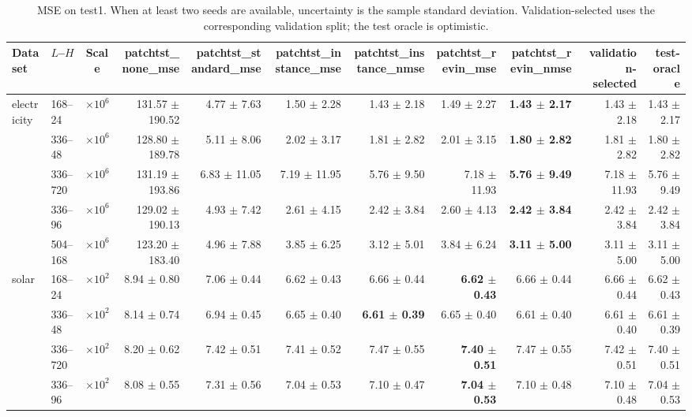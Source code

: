 \begin{table}[htbp]
\centering
\caption{MSE on test1. When at least two seeds are available, uncertainty is the sample standard deviation. Validation-selected uses the corresponding validation split; the test oracle is optimistic.}
\begin{tabular}{llcrrrrrrr|r}
\toprule
Dataset & $L$--$H$ & Scale & patchtst\_none\_mse & patchtst\_standard\_mse & patchtst\_instance\_mse & patchtst\_instance\_nmse & patchtst\_revin\_mse & patchtst\_revin\_nmse & validation-selected & test-oracle \\
\midrule
electricity & 168--24 & $\times 10^{6}$ & 131.57 $\pm$ 190.52 & 4.77 $\pm$ 7.63 & 1.50 $\pm$ 2.28 & 1.43 $\pm$ 2.18 & 1.49 $\pm$ 2.27 & \textbf{1.43 $\pm$ 2.17} & 1.43 $\pm$ 2.18 & 1.43 $\pm$ 2.17 \\
 & 336--48 & $\times 10^{6}$ & 128.80 $\pm$ 189.78 & 5.11 $\pm$ 8.06 & 2.02 $\pm$ 3.17 & 1.81 $\pm$ 2.82 & 2.01 $\pm$ 3.15 & \textbf{1.80 $\pm$ 2.82} & 1.81 $\pm$ 2.82 & 1.80 $\pm$ 2.82 \\
 & 336--720 & $\times 10^{6}$ & 131.19 $\pm$ 193.86 & 6.83 $\pm$ 11.05 & 7.19 $\pm$ 11.95 & 5.76 $\pm$ 9.50 & 7.18 $\pm$ 11.93 & \textbf{5.76 $\pm$ 9.49} & 7.18 $\pm$ 11.93 & 5.76 $\pm$ 9.49 \\
 & 336--96 & $\times 10^{6}$ & 129.02 $\pm$ 190.13 & 4.93 $\pm$ 7.42 & 2.61 $\pm$ 4.15 & 2.42 $\pm$ 3.84 & 2.60 $\pm$ 4.13 & \textbf{2.42 $\pm$ 3.84} & 2.42 $\pm$ 3.84 & 2.42 $\pm$ 3.84 \\
 & 504--168 & $\times 10^{6}$ & 123.20 $\pm$ 183.40 & 4.96 $\pm$ 7.88 & 3.85 $\pm$ 6.25 & 3.12 $\pm$ 5.01 & 3.84 $\pm$ 6.24 & \textbf{3.11 $\pm$ 5.00} & 3.11 $\pm$ 5.00 & 3.11 $\pm$ 5.00 \\
\midrule
solar & 168--24 & $\times 10^{2}$ & 8.94 $\pm$ 0.80 & 7.06 $\pm$ 0.44 & 6.62 $\pm$ 0.43 & 6.66 $\pm$ 0.44 & \textbf{6.62 $\pm$ 0.43} & 6.66 $\pm$ 0.44 & 6.66 $\pm$ 0.44 & 6.62 $\pm$ 0.43 \\
 & 336--48 & $\times 10^{2}$ & 8.14 $\pm$ 0.74 & 6.94 $\pm$ 0.45 & 6.65 $\pm$ 0.40 & \textbf{6.61 $\pm$ 0.39} & 6.65 $\pm$ 0.40 & 6.61 $\pm$ 0.40 & 6.61 $\pm$ 0.40 & 6.61 $\pm$ 0.39 \\
 & 336--720 & $\times 10^{2}$ & 8.20 $\pm$ 0.62 & 7.42 $\pm$ 0.51 & 7.41 $\pm$ 0.52 & 7.47 $\pm$ 0.55 & \textbf{7.40 $\pm$ 0.51} & 7.47 $\pm$ 0.55 & 7.42 $\pm$ 0.51 & 7.40 $\pm$ 0.51 \\
 & 336--96 & $\times 10^{2}$ & 8.08 $\pm$ 0.55 & 7.31 $\pm$ 0.56 & 7.04 $\pm$ 0.53 & 7.10 $\pm$ 0.47 & \textbf{7.04 $\pm$ 0.53} & 7.10 $\pm$ 0.48 & 7.10 $\pm$ 0.48 & 7.04 $\pm$ 0.53 \\

\end{tabular}
\end{table}

